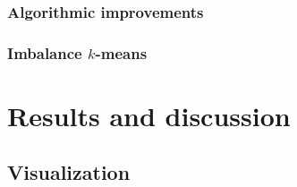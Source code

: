 \documentclass[10pt,letterpaper]{article}
\begin{document}

\subsubsection*{Algorithmic improvements}
\label{sec:MaterialsMethods:sub:Clustering:sub:Improvements}


\subsubsection*{Imbalance \texorpdfstring{$k$-means}{k-means}}
\label{sec:MaterialsMethods:sub:Clustering:sub:EdgeImbalances}


\section*{Results and discussion}
\label{sec:Results}


\subsection*{Visualization}
\label{sec:Results:sub:Visualization}

\end{document}
